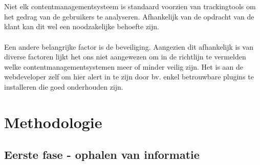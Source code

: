 \\\\
Niet elk contentmanagementsysteem is standaard voorzien van trackingtools om het gedrag van de gebruikers te analyseren. Afhankelijk van de opdracht van de klant kan dit wel een noodzakelijke behoefte zijn. \autocite{DeBruijn2013}
\\\\
Een andere belangrijke factor is de beveiliging. Aangezien dit afhankelijk is van diverse factoren lijkt het ons niet aangewezen om in de richtlijn te vermelden welke contentmanagementsystemen meer of minder veilig zijn. Het is aan de webdeveloper zelf om hier alert in te zijn door bv. enkel betrouwbare plugins te installeren die goed onderhouden zijn. \autocite{Bottelbergs2013}

\section{Methodologie}%
\label{sec:methodologie}

\subsection{Eerste fase - ophalen van informatie}

